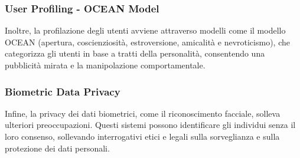 \documentclass{report}
\begin{document}
\subsubsection{User Profiling - OCEAN Model}
Inoltre, la profilazione degli utenti avviene attraverso modelli come il modello OCEAN (apertura, coscienziosità, estroversione, amicalità e nevroticismo), che categorizza gli utenti in base a tratti della personalità, consentendo una pubblicità mirata e la manipolazione comportamentale.

\subsubsection{Biometric Data Privacy}
Infine, la privacy dei dati biometrici, come il riconoscimento facciale, solleva ulteriori preoccupazioni. 
Questi sistemi possono identificare gli individui senza il loro consenso, sollevando interrogativi etici e legali sulla sorveglianza e sulla protezione dei dati personali.
\end{document}
